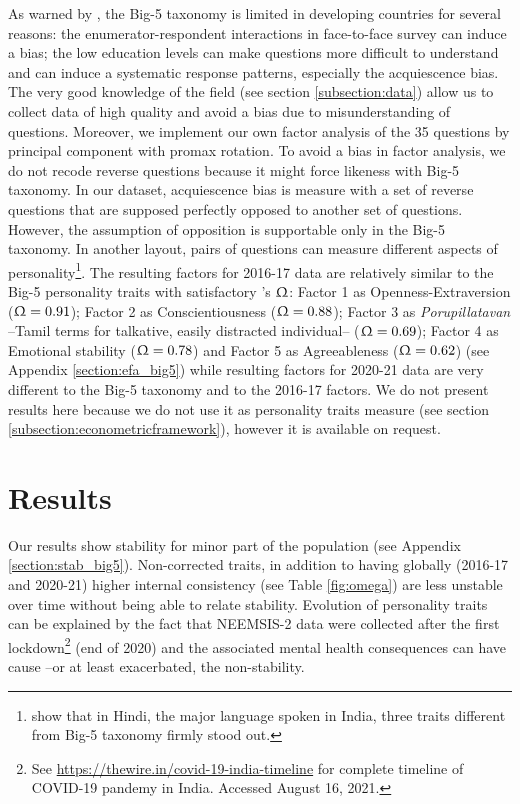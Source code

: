 \documentclass[a4paper, 12pt, onecolumn]{article}
\begin{document}
As warned by \cite{Laajaj2019}, the Big-5 taxonomy is limited in developing countries for several reasons: the enumerator-respondent interactions in face-to-face survey can induce a bias; the low education levels can make questions more difficult to understand and can induce a systematic response patterns, especially the acquiescence bias.
The very good knowledge of the field (see section \ref{subsection:data}) allow us to collect data of high quality and avoid a bias due to misunderstanding of questions.
Moreover, we implement our own factor analysis of the 35 questions by principal component with promax rotation.
To avoid a bias in factor analysis, we do not recode reverse questions because it might force likeness with Big-5 taxonomy.
In our dataset, acquiescence bias is measure with a set of reverse questions that are supposed perfectly opposed to another set of questions. 
However, the assumption of opposition is supportable only in the Big-5 taxonomy.
In another layout, pairs of questions can measure different aspects of personality\footnote{\cite{Singh2013} show that in Hindi, the major language spoken in India, three traits different from Big-5 taxonomy firmly stood out.}.
The resulting factors for 2016-17 data are relatively similar to the Big-5 personality traits with satisfactory \citeauthor{McDonald1999}'s $\Upomega$: Factor 1 as Openness-Extraversion ($\Upomega=0.91$); Factor 2 as Conscientiousness ($\Upomega=0.88$); Factor 3 as \textit{Porupillatavan} --Tamil terms for talkative, easily distracted individual-- ($\Upomega=0.69$); Factor 4 as Emotional stability ($\Upomega=0.78$) and Factor 5 as Agreeableness ($\Upomega=0.62$) (see Appendix \ref{section:efa_big5}) while resulting factors for 2020-21 data are very different to the Big-5 taxonomy and to the 2016-17 factors.
We do not present results here because we do not use it as personality traits measure (see section \ref{subsection:econometricframework}), however it is available on request.



\clearpage
\newpage
\section{Results}

Our results show stability for minor part of the population (see Appendix \ref{section:stab_big5}).
Non-corrected traits, in addition to having globally (2016-17 and 2020-21) higher internal consistency (see Table \ref{fig:omega}) are less unstable over time without being able to relate stability.
Evolution of personality traits can be explained by the fact that NEEMSIS-2 data were collected after the first lockdown\footnote{See \url{https://thewire.in/covid-19-india-timeline} for complete timeline of COVID-19 pandemy in India. Accessed August 16, 2021.} (end of 2020) and the associated mental health consequences \citep{Golechha2020, Kochhar2020} can have cause --or at least exacerbated, the non-stability.
\end{document}
